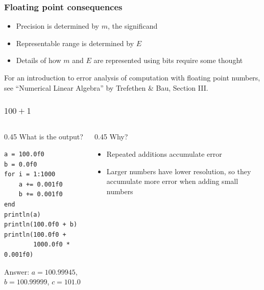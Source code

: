 \documentclass[aspectratio=169,hyperref={bookmarks=false,urlcolor=blue,colorlinks=true},10pt]{beamer}
\begin{document}
\begin{frame}
  \frametitle{Floating point consequences}

  \begin{itemize}
  \item Precision is determined by $m$, the significand
  \item Representable range is determined by $E$
  \item Details of how $m$ and $E$ are represented using bits require some thought
  \end{itemize}

  \vspace{\baselineskip}

  For an introduction to error analysis of computation with floating point numbers, see ``Numerical
  Linear Algebra'' by Trefethen \& Bau, Section III.
\end{frame}

\begin{frame}[fragile]
  \frametitle{$100+1$}

  \begin{columns}[t]
    \begin{column}{0.45\textwidth}
      What is the output?

      \begin{lstlisting}
a = 100.0f0
b = 0.0f0
for i = 1:1000
    a += 0.001f0
    b += 0.001f0
end
println(a)
println(100.0f0 + b)
println(100.0f0 +
        1000.0f0 * 0.001f0)
      \end{lstlisting}

      \pause

      Answer: $a=100.99945$, $b=100.99999$, $c=101.0$
    \end{column}
    \begin{column}{0.45\textwidth}
      Why?

      \pause

      \begin{itemize}
      \item Repeated additions accumulate error
      \item Larger numbers have lower resolution, so they accumulate more error when adding small
        numbers
      \end{itemize}
    \end{column}
  \end{columns}
\end{frame}
\end{document}
